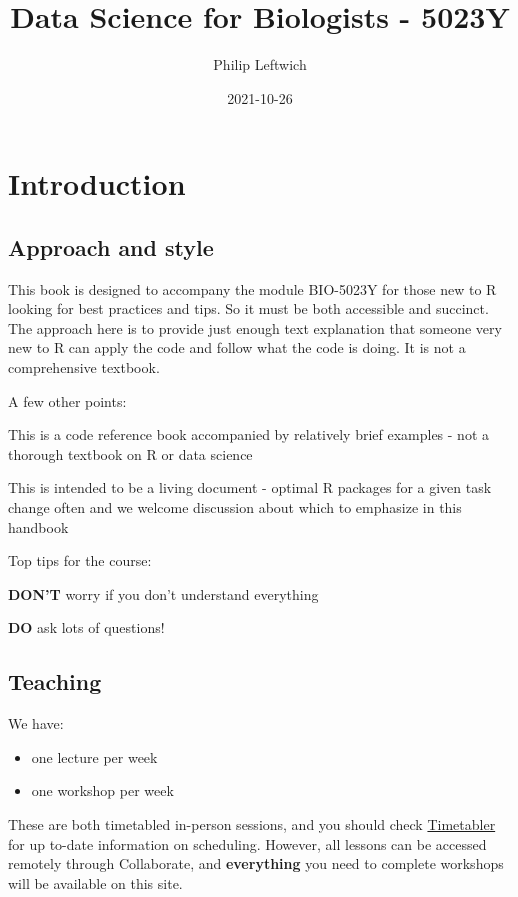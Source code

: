 \documentclass[
]{book}
\title{Data Science for Biologists - 5023Y}
\author{Philip Leftwich}
\date{2021-10-26}
\providecommand{\tightlist}{%
  \setlength{\itemsep}{0pt}\setlength{\parskip}{0pt}}
\begin{document}
\maketitle

{
\setcounter{tocdepth}{1}
\tableofcontents
}
\hypertarget{introduction}{%
\chapter{Introduction}\label{introduction}}

\hypertarget{approach-and-style}{%
\section{Approach and style}\label{approach-and-style}}

This book is designed to accompany the module BIO-5023Y for those new to R looking for best practices and tips. So it must be both accessible and succinct. The approach here is to provide just enough text explanation that someone very new to R can apply the code and follow what the code is doing. It is not a comprehensive textbook.

A few other points:

This is a code reference book accompanied by relatively brief examples - not a thorough textbook on R or data science

This is intended to be a living document - optimal R packages for a given task change often and we welcome discussion about which to emphasize in this handbook

Top tips for the course:

\textbf{DON'T} worry if you don't understand everything

\textbf{DO} ask lots of questions!

\hypertarget{teaching}{%
\section{Teaching}\label{teaching}}

We have:

\begin{itemize}
\tightlist
\item
  one lecture per week
\item
  one workshop per week
\end{itemize}

These are both timetabled in-person sessions, and you should check \href{https://timetabler.uea.ac.uk/Timetable}{Timetabler} for up to-date information on scheduling. However, all lessons can be accessed remotely through Collaborate, and \textbf{everything} you need to complete workshops will be available on this site.
\end{document}

